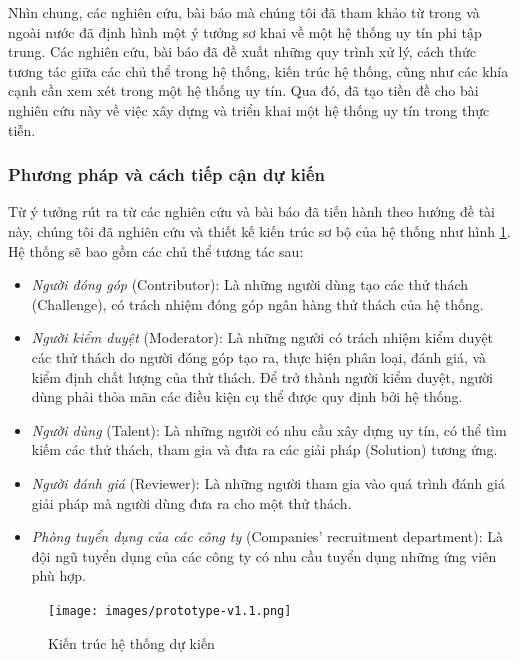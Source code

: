 \documentclass{article}[14pt]
\begin{document}
{            \par
            Nhìn chung, các nghiên cứu, bài báo mà chúng tôi đã tham khảo từ trong và ngoài nước đã định hình một ý tưởng sơ khai về một hệ thống uy tín phi tập trung. Các nghiên cứu, bài báo đã đề xuất những quy trình xử lý, cách thức tương tác giữa các chủ thể trong hệ thống, kiến trúc hệ thống, cũng như các khía cạnh cần xem xét trong một hệ thống uy tín. Qua đó, đã tạo tiền đề cho bài nghiên cứu này về việc xây dựng và triển khai một hệ thống uy tín trong thực tiễn.  

        \subsubsection{Phương pháp và cách tiếp cận dự kiến}
            Từ ý tưởng rút ra từ các nghiên cứu và bài báo đã tiến hành theo hướng đề tài này, chúng tôi đã nghiên cứu và thiết kế kiến trúc sơ bộ của hệ thống như hình \ref{fig:architect}. Hệ thống sẽ bao gồm các chủ thể tương tác sau: 
            \begin{itemize}
                \item \textit{Người đóng góp} (Contributor): Là những người dùng tạo các thử thách (Challenge), có trách nhiệm đóng góp ngân hàng thử thách của hệ thống.
                \item \textit{Người kiểm duyệt} (Moderator): Là những người có trách nhiệm kiểm duyệt các thử thách do người đóng góp tạo ra, thực hiện phân loại, đánh giá, và kiểm định chất lượng của thử thách. Để trở thành người kiểm duyệt, người dùng phải thỏa mãn các điều kiện cụ thể được quy định bởi hệ thống. 
                \item \textit{Người dùng} (Talent): Là những người có nhu cầu xây dựng uy tín, có thể tìm kiếm các thử thách, tham gia và đưa ra các giải pháp (Solution) tương ứng.
                \item \textit{Người đánh giá} (Reviewer): Là những người tham gia vào quá trình đánh giá giải pháp mà người dùng đưa ra cho một thử thách.
                \item \textit{Phòng tuyển dụng của các công ty} (Companies' recruitment department): Là đội ngũ tuyển dụng của các công ty có nhu cầu tuyển dụng những ứng viên phù hợp.
            \end{itemize}

            \begin{figure} [h!]
                \centering
                \texttt{[image: images/prototype-v1.1.png]}
                \caption{Kiến trúc hệ thống dự kiến}
                \label{fig:architect}
            \end{figure}

}
\end{document}
